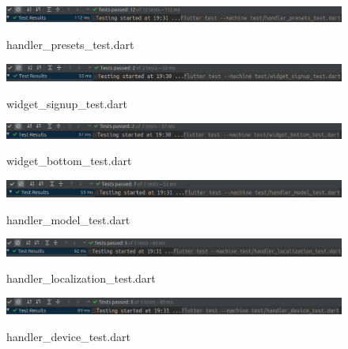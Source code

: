 \documentclass[../ATD.tex]{subfiles}
\begin{document}
    \begin{figure}[H]
        \centering
        \includegraphics[scale = 0.5]{assets/t1.png}\\
        \caption[handler\_presets\_test.dart]{handler\_presets\_test.dart}
    \end{figure}
    \begin{figure}[H]
        \centering
        \includegraphics[scale = 0.5]{assets/t2.png}\\
        \caption[widget\_signup\_test.dart]{widget\_signup\_test.dart}
    \end{figure}
    \begin{figure}[H]
        \centering
        \includegraphics[scale = 0.5]{assets/t3.png}\\
        \caption[widget\_bottom\_test.dart]{widget\_bottom\_test.dart}
    \end{figure}
    \begin{figure}[H]
        \centering
        \includegraphics[scale = 0.5]{assets/t4.png}\\
        \caption[handler\_model\_test.dart]{handler\_model\_test.dart}
    \end{figure}
    \begin{figure}[H]
        \centering
        \includegraphics[scale = 0.45]{assets/t5.png}\\
        \caption[handler\_localization\_test.dart]{handler\_localization\_test.dart}
    \end{figure}
    \begin{figure}[H]
        \centering
        \includegraphics[scale = 0.5]{assets/t6.png}\\
        \caption[handler\_device\_test.dart]{handler\_device\_test.dart}
    \end{figure}
\end{document}
